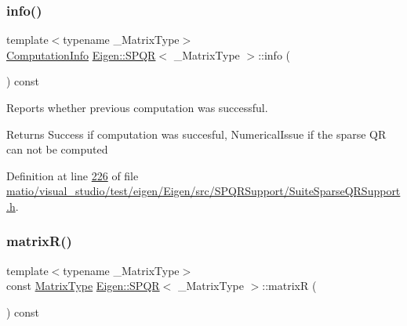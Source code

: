 \subsubsection{\texorpdfstring{info()}{info()}\hspace{0.1cm}{\footnotesize\ttfamily [2/2]}}
{\footnotesize\ttfamily template$<$typename \+\_\+\+Matrix\+Type$>$ \\
\hyperlink{group__enums_ga85fad7b87587764e5cf6b513a9e0ee5e}{Computation\+Info} \hyperlink{class_eigen_1_1_s_p_q_r}{Eigen\+::\+S\+P\+QR}$<$ \+\_\+\+Matrix\+Type $>$\+::info (\begin{DoxyParamCaption}{ }\end{DoxyParamCaption}) const\hspace{0.3cm}{\ttfamily [inline]}}



Reports whether previous computation was successful. 

\begin{DoxyReturn}{Returns}
{\ttfamily Success} if computation was succesful, {\ttfamily Numerical\+Issue} if the sparse QR can not be computed 
\end{DoxyReturn}


Definition at line \hyperlink{matio_2visual__studio_2test_2eigen_2_eigen_2src_2_s_p_q_r_support_2_suite_sparse_q_r_support_8h_source_l00226}{226} of file \hyperlink{matio_2visual__studio_2test_2eigen_2_eigen_2src_2_s_p_q_r_support_2_suite_sparse_q_r_support_8h_source}{matio/visual\+\_\+studio/test/eigen/\+Eigen/src/\+S\+P\+Q\+R\+Support/\+Suite\+Sparse\+Q\+R\+Support.\+h}.

\mbox{\label{class_eigen_1_1_s_p_q_r_ad51661be35674dd6a65e27699dbb3fb9}} 
\subsubsection{\texorpdfstring{matrix\+R()}{matrixR()}\hspace{0.1cm}{\footnotesize\ttfamily [1/2]}}
{\footnotesize\ttfamily template$<$typename \+\_\+\+Matrix\+Type$>$ \\
const \hyperlink{group___sparse_core___module}{Matrix\+Type} \hyperlink{class_eigen_1_1_s_p_q_r}{Eigen\+::\+S\+P\+QR}$<$ \+\_\+\+Matrix\+Type $>$\+::matrixR (\begin{DoxyParamCaption}{ }\end{DoxyParamCaption}) const\hspace{0.3cm}{\ttfamily [inline]}}

